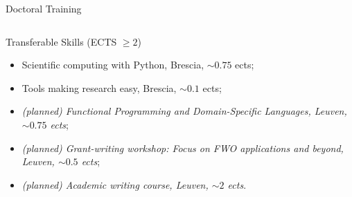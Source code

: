 \documentclass[handout,10pt]{beamer}
\begin{document}
\begin{frame}[shrink]{Doctoral Training}
\begin{columns}
\begin{column}{.50\linewidth}
\begin{exampleblock}{	\textbf{\CheckedBox} Transferable Skills (ECTS $\geq 2$)}
\begin{itemize}
			\item Scientific computing with Python, Brescia, $\sim 0.75$ ects;
			\item Tools making research easy, Brescia, $\sim 0.1$ ects;
			\item \emph{(planned) Functional Programming and Domain-Specific Languages, Leuven, $\sim 0.75$ ects};
			\item \emph{(planned) Grant-writing workshop: Focus on FWO applications and beyond, Leuven, $\sim 0.5$ ects};
			\item \emph{(planned) Academic writing course, Leuven, $\sim 2$ ects}.
		\end{itemize}
	\end{exampleblock}	
  \end{column}
\end{columns}
\end{frame}
\end{document}
